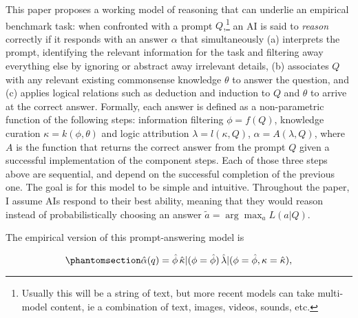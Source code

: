 \documentclass[
]{article}
\theoremstyle{plain}
\theoremstyle{definition}
\theoremstyle{remark}
\begin{document}
This paper proposes a working model of reasoning that can underlie an
empirical benchmark task: when confronted with a prompt
\(Q\),\footnote{Usually this will be a string of text, but more recent
  models can take multi-model content, ie a combination of text, images,
  videos, sounds, etc.} an AI is said to \emph{reason} correctly if it
responds with an answer \(\alpha\) that simultaneously (a) interprets
the prompt, identifying the relevant information for the task and
filtering away everything else by ignoring or abstract away irrelevant
details, (b) associates \(Q\) with any relevant existing commonsense
knowledge \(\theta\) to answer the question, and (c) applies logical
relations such as deduction and induction to \(Q\) and \(\theta\) to
arrive at the correct answer. Formally, each answer is defined as a
non-parametric function of the following steps: information filtering
\(\phi = f(Q)\), knowledge curation \(\kappa = k(\phi, \theta)\) and
logic attribution \(\lambda = l(\kappa, Q)\),
\(\alpha = A(\lambda, Q)\), where \(A\) is the function that returns the
correct answer from the prompt \(Q\) given a successful implementation
of the component steps. Each of those three steps above are sequential,
and depend on the successful completion of the previous one. The goal is
for this model to be simple and intuitive. Throughout the paper, I
assume AIs respond to their best ability, meaning that they would reason
instead of probabilistically choosing an answer
\(\tilde{a} = \arg \max_{a} L(a | Q)\).

The empirical version of this prompt-answering model is

\begin{equation}\phantomsection\label{eq-empiric}{\hat{\alpha}(q) = \hat{\phi} \, \hat{\kappa}|(\phi=\hat{\phi}) \, \hat{\lambda}|(\phi=\hat{\phi}, \kappa=\hat{\kappa}),
}\end{equation}
\end{document}
